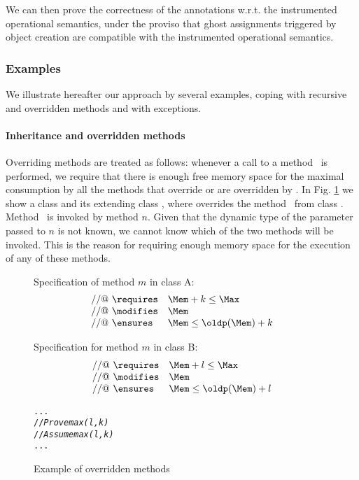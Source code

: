 We can then prove the correctness of the annotations w.r.t. the
instrumented operational semantics, under the proviso that ghost
assignments triggered by object creation are compatible with the
instrumented operational semantics. 

\subsubsection{Examples}
We illustrate hereafter our approach by several examples, coping with
recursive and overridden methods and with exceptions.

\paragraph{Inheritance and overridden methods} Overriding methods
are treated as follows: whenever a call to a method \method\ is
performed, we require that there is enough free memory space for the
maximal consumption by all the methods that override or are overridden
by \method. In Fig. \ref{classExt} we show a class 
and its extending class , where  overrides the
method \method\ from class . Method \method\ is
invoked by method $n$. Given that the dynamic type of the
parameter passed to $n$ is not known, we cannot know which of the
two methods will be invoked. This is the reason for requiring enough
memory space for the execution of any of these methods.




\begin{figure}[!t]%
Specification of method $m$ in class A:
$$
\begin{array}{ll}
//@ \ \requires & \Mem + k  \leq \Max \\
//@ \ \modifies & \Mem \\
//@ \ \ensures & \Mem  \leq \oldp(\Mem) + k
\end{array}
$$

Specification for method $m$ in class B:
$$
\begin{array}{ll}
//@ \ \requires & \Mem + l  \leq \Max \\
//@ \ \modifies & \Mem \\
//@ \ \ensures & \Mem  \leq \oldp(\Mem) + l
\end{array}
$$

\begin{alltt}
... 
//\small{\textit{Prove } \srcCode{\Mem +} \textit{max(l,k)} \srcCode{<= \Max}}
//\small{\textit{Assume } \srcCode{\Mem <= \oldp(\Mem) +} \textit{max(l,k)}}
...
\end{alltt}

\caption{\sc Example of overridden methods}
\label{classExt}
\end{figure}


